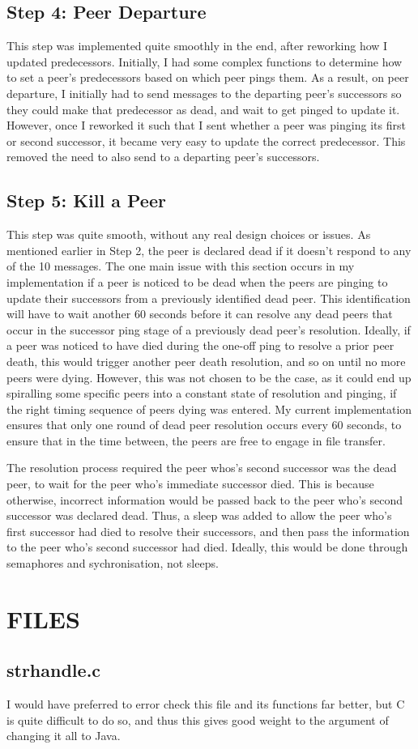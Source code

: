 \documentclass[a4paper,11pt]{article}
\begin{document}
\subsection*{Step 4: Peer Departure}
This step was implemented quite smoothly in the end, after reworking how I updated predecessors. Initially, I had some complex functions to determine how to set a peer's predecessors based on which peer pings them. As a result, on peer departure, I initially had to send messages to the departing peer's successors so they could make that predecessor as dead, and wait to get pinged to update it. However, once I reworked it such that I sent whether a peer was pinging its first or second successor, it became very easy to update the correct predecessor. This removed the need to also send to a departing peer's successors. 

\subsection*{Step 5: Kill a Peer}
This step was quite smooth, without any real design choices or issues. As mentioned earlier in Step 2, the peer is declared dead if it doesn't respond to any of the 10 messages. The one main issue with this section occurs in my implementation if a peer is noticed to be dead when the peers are pinging to update their successors from a previously identified dead peer. This identification will have to wait another 60 seconds before it can resolve any dead peers that occur in the successor ping stage of a previously dead peer's resolution. Ideally, if a peer was noticed to have died during the one-off ping to resolve a prior peer death, this would trigger another peer death resolution, and so on until no more peers were dying. However, this was not chosen to be the case, as it could end up spiralling some specific peers into a constant state of resolution and pinging, if the right timing sequence of peers dying was entered. My current implementation ensures that only one round of dead peer resolution occurs every 60 seconds, to ensure that in the time between, the peers are free to engage in file transfer. 

\bigbreak

\noindent The resolution process required the peer whos's second successor was the dead peer, to wait for the peer who's immediate successor died. This is because otherwise, incorrect information would be passed back to the peer who's second successor was declared dead. Thus, a sleep was added to allow the peer who's first successor had died to resolve their successors, and then pass the information to the peer who's second successor had died. Ideally, this would be done through semaphores and sychronisation, not sleeps.

\bigbreak

\section{FILES}
\subsection*{strhandle.c}
I would have preferred to error check this file and its functions far better, but C is quite difficult to do so, and thus this gives good weight to the argument of changing it all to Java.
\end{document}
